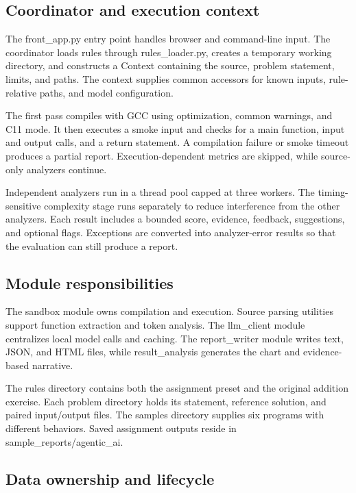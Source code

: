 \documentclass[conference]{IEEEtran}
\begin{document}
\newpage

\subsection{Coordinator and execution context}

The front\_app.py entry point handles browser and command-line input. The coordinator loads rules through rules\_loader.py, creates a temporary working directory, and constructs a Context containing the source, problem statement, limits, and paths. The context supplies common accessors for known inputs, rule-relative paths, and model configuration.


The first pass compiles with GCC using optimization, common warnings, and C11 mode. It then executes a smoke input and checks for a main function, input and output calls, and a return statement. A compilation failure or smoke timeout produces a partial report. Execution-dependent metrics are skipped, while source-only analyzers continue.


Independent analyzers run in a thread pool capped at three workers. The timing-sensitive complexity stage runs separately to reduce interference from the other analyzers. Each result includes a bounded score, evidence, feedback, suggestions, and optional flags. Exceptions are converted into analyzer-error results so that the evaluation can still produce a report.


\subsection{Module responsibilities}

The sandbox module owns compilation and execution. Source parsing utilities support function extraction and token analysis. The llm\_client module centralizes local model calls and caching. The report\_writer module writes text, JSON, and HTML files, while result\_analysis generates the chart and evidence-based narrative.


The rules directory contains both the assignment preset and the original addition exercise. Each problem directory holds its statement, reference solution, and paired input/output files. The samples directory supplies six programs with different behaviors. Saved assignment outputs reside in sample\_reports/agentic\_ai.


\subsection{Data ownership and lifecycle}
\end{document}
